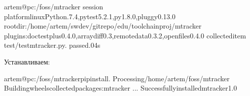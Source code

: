 \documentclass[letterpaper,10pt,russian]{sphinxmanual}
\begin{document}
\begin{sphinxVerbatim}[commandchars=\\\{\}]
artem@pc:\PYGZti{}/foss/mtracker\PYGZdl{}
session
platformlinux\PYGZhy{}\PYGZhy{}Python.7.4,pytest\PYGZhy{}5.2.1,py\PYGZhy{}1.8.0,pluggy\PYGZhy{}0.13.0
rootdir:/home/artem/swdev/gitrepo/edu/toolchain\PYGZus{}proj/mtracker
plugins:doctestplus\PYGZhy{}0.4.0,arraydiff\PYGZhy{}0.3,remotedata\PYGZhy{}0.3.2,openfiles\PYGZhy{}0.4.0
collecteditem
test/test\PYGZus{}mtracker.py.\PYG{o}{[}\PYGZpc{}\PYG{o}{]}
passed.04s
\end{sphinxVerbatim}

\sphinxAtStartPar
Устанавливаем:

\begin{sphinxVerbatim}[commandchars=\\\{\}]
artem@pc:\PYGZti{}/foss/mtracker\PYGZdl{}pipinstall.
Processing/home/artem/foss/mtracker
Buildingwheelscollectedpackages:mtracker
...
Successfullyinstalledmtracker\PYGZhy{}1.0
\end{sphinxVerbatim}
\end{document}
